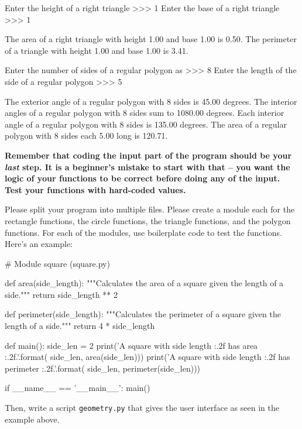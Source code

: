 \documentclass[11pt]{cselabheader}
\begin{document}
{\begin{ex}[geometry.py]
\begin{verbatimcode}
Enter the height of a right triangle >>> 1
Enter the base of a right triangle >>> 1

The area of a right triangle with height 1.00 and base 1.00 is 0.50.
The perimeter of a triangle with height 1.00 and base 1.00 is 3.41.

Enter the number of sides of a regular polygon as >>> 8
Enter the length of the side of a regular polygon >>> 5

The exterior angle of a regular polygon with 8 sides is 45.00 degrees.
The interior angles of a regular polygon with 8 sides sum to 1080.00 degrees.
Each interior angle of a regular polygon with 8 sides is 135.00 degrees.
The area of a regular polygon with 8 sides each 5.00 long is 120.71.
  \end{verbatimcode}

  \begin{center}
    \bfseries Remember that coding the input part of the program should be your
    \emph{last} step. It is a beginner's mistake to start with that -- you want
    the logic of your functions to be correct before doing any of the input.
    Test your functions with hard-coded values.
  \end{center}

  Please split your program into multiple files. Please create a module each for
  the rectangle functions, the circle functions, the triangle functions, and the
  polygon functions. For each of the modules, use boilerplate code to test the
  functions. Here's an example:

  \begin{python3code}
# Module square (square.py)

def area(side_length):
    """Calculates the area of a square given the length of a side."""
    return side_length ** 2

def perimeter(side_length):
    """Calculates the perimeter of a square given the length of a side."""
    return 4 * side_length

def main():
    side_len = 2
    print('A square with side length {:.2f} has area {:.2f}.'.format(
        side_len, area(side_len)))
    print('A square with side length {:.2f} has perimeter {:.2f}.'.format(
        side_len, perimeter(side_len)))

if __name__ == '__main__':
    main()
  \end{python3code}

  Then, write a script \texttt{geometry.py} that gives the user interface as
  seen in the example above.


\end{ex}}
\end{document}
